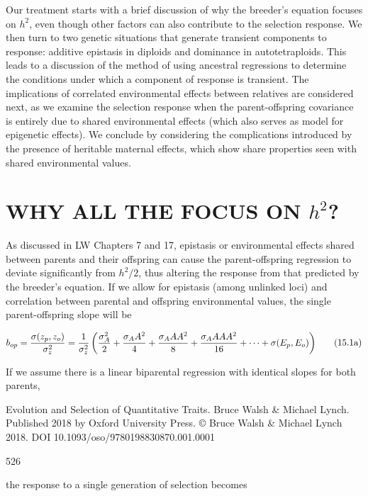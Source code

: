 \documentclass{article}
\begin{document}
Our treatment starts with a brief discussion of why the breeder’s equation focuses on  $ h^{2} $, even though other factors can also contribute to the selection response. We then turn to two genetic situations that generate transient components to response: additive epistasis in diploids and dominance in autotetraploids. This leads to a discussion of the method of using ancestral regressions to determine the conditions under which a component of response is transient. The implications of correlated environmental effects between relatives are considered next, as we examine the selection response when the parent-offspring covariance is entirely due to shared environmental effects (which also serves as model for epigenetic effects). We conclude by considering the complications introduced by the presence of heritable maternal effects, which show share properties seen with shared environmental values.

\section{WHY ALL THE FOCUS ON  $ h^{2} $?}
As discussed in LW Chapters 7 and 17, epistasis or environmental effects shared between parents and their offspring can cause the parent-offspring regression to deviate significantly from  $ h^{2}/2 $, thus altering the response from that predicted by the breeder's equation. If we allow for epistasis (among unlinked loci) and correlation between parental and offspring environmental values, the single parent-offspring slope will be

\begin{equation}
\begin{align*}b_{op}={\sigma(z_p,z_o)\over\sigma_z^2}={1\over\sigma_z^2}\left({\sigma_A^2\over2}+{\sigma_AA^2\over4}+{\sigma_AAA^2\over8}+{\sigma_AAAA^2\over16}+\cdots+\sigma(E_p,E_o)\right)\end{align*}
\tag{15.1a}
\label{eq:15_1a}
\end{equation}

If we assume there is a linear biparental regression with identical slopes for both parents,

Evolution and Selection of Quantitative Traits. Bruce Walsh & Michael Lynch. Published 2018 by Oxford University Press. © Bruce Walsh & Michael Lynch 2018. DOI 10.1093/oso/9780198830870.001.0001

526

the response to a single generation of selection becomes
\end{document}
